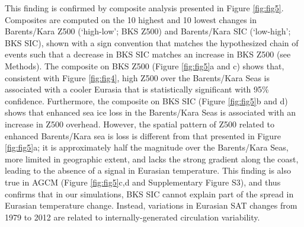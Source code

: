 \documentclass{nature}
\begin{document}


This finding is confirmed by composite analysis presented in Figure \ref{fig:fig5}. Composites are computed on the 10 highest and 10 lowest changes in Barents/Kara Z500 (`high-low'; BKS Z500) and Barents/Kara SIC (`low-high'; BKS SIC), shown with a sign convention that matches the hypothesized chain of events such that a decrease in BKS SIC matches an increase in BKS Z500 (see Methods). The composite on BKS Z500 (Figure \ref{fig:fig5}a and c) shows that, consistent with Figure \ref{fig:fig4}, high Z500 over the Barents/Kara Seas is associated with a cooler Eurasia that is statistically significant with 95\% confidence. Furthermore, the composite on BKS SIC (Figure \ref{fig:fig5}b and d) shows that enhanced sea ice loss in the Barents/Kara Seas is associated with an increase in Z500 overhead. However, the spatial pattern of Z500 related to enhanced Barents/Kara sea is loss is different from that presented in Figure \ref{fig:fig5}a; it is approximately half the magnitude over the Barents/Kara Seas, more limited in geographic extent, and lacks the strong gradient along the coast, leading to the absence of a signal in Eurasian temperature. This finding is also true in AGCM (Figure \ref{fig:fig5}c,d and Supplementary Figure S3), and thus confirms that in our simulations, BKS SIC cannot explain part of the spread in Eurasian temperature change. Instead, variations in Eurasian SAT changes from 1979 to 2012 are related to internally-generated circulation variability.
\end{document}
